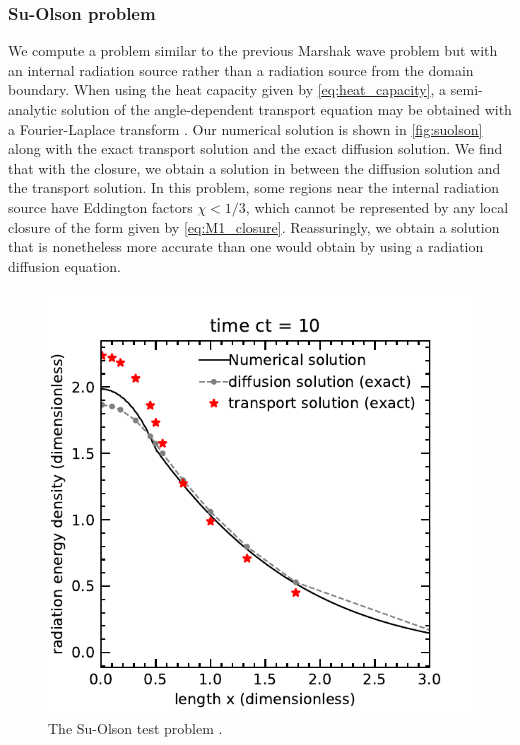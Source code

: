 \documentclass[fleqn,usenatbib]{mnras}
\begin{document}
\subsubsection{Su-Olson problem}
We compute a problem similar to the previous Marshak wave problem but with an internal radiation source rather than a radiation source from the domain boundary. When using the heat capacity given by \autoref{eq:heat_capacity}, a semi-analytic solution of the angle-dependent transport equation may be obtained with a Fourier-Laplace transform \citep{Su_1997}. Our numerical solution is shown in \autoref{fig:suolson} along with the exact transport solution and the exact diffusion solution. We find that with the \cite{Levermore_1984} closure, we obtain a solution in between the diffusion solution and the transport solution. In this problem, some regions near the internal radiation source have Eddington factors $\chi < 1/3$, which cannot be represented by any local closure of the form given by \autoref{eq:M1_closure}. Reassuringly, we obtain a solution that is nonetheless more accurate than one would obtain by using a radiation diffusion equation.
\begin{figure}
    \includegraphics[width=\columnwidth]{SuOlsonTest.pdf}
    \caption{The Su-Olson test problem \citep{Su_1997}.}
    \label{fig:suolson}
\end{figure}
\end{document}
